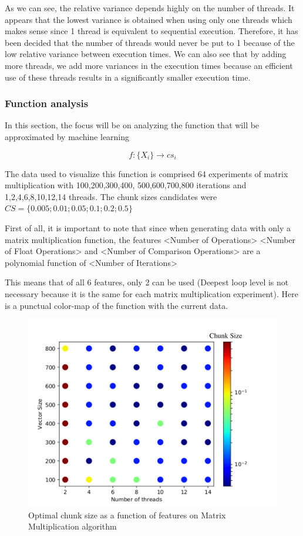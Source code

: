 As we can see, the relative variance depends highly on the number of threads. It appears that the lowest variance is obtained when using only one threads which makes sense since 1 thread is equivalent to sequential execution. Therefore, it has been decided that the number of threads would never be put to 1 because of the low relative variance between execution times. We can also see that by adding more threads, we add more variances in the execution times because an efficient use of these threads results in a significantly smaller execution time.

\subsubsection{Function analysis}
In this section, the focus will be on analyzing the function that will be approximated by machine learning

$$f:\{X_i\} \rightarrow cs_i$$

The data used to visualize this function is comprised 64 experiments of matrix multiplication with 100,200,300,400, 500,600,700,800 iterations and 1,2,4,6,8,10,12,14 threads. The chunk sizes candidates were $CS=\{0.005; 0.01 ;0.05; 0.1; 0.2; 0.5\}$

First of all, it is important to note that since when generating data with only a matrix multiplication function, the features <Number of Operations> <Number of Float Operations> and <Number of Comparison Operations> are a polynomial function of <Number of Iterations>

This means that of all 6 features, only 2 can be used (Deepest loop level is not necessary because it is the same for each matrix multiplication experiment). Here is a punctual color-map of the function with the current data.

\begin{figure}[H]
	\centering
	\includegraphics[width=120mm]{images/chunk_size_function_matrix.pdf}
	\caption{Optimal chunk size as a function of features on Matrix Multiplication algorithm}
\end{figure}

